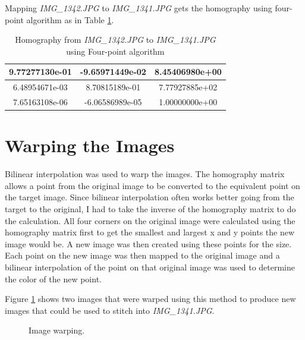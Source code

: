 \documentclass[paper=a4, fontsize=11pt]{scrartcl}
\begin{document}
Mapping \emph{IMG\_1342.JPG} to \emph{IMG\_1341.JPG} gets the homography using four-point algorithm as in Table \ref{tb:homograph:four_point}.
\begin{table}
\caption{Homography from \emph{IMG\_1342.JPG} to \emph{IMG\_1341.JPG} using Four-point algorithm}
\label{tb:homograph:four_point}
\begin{center}
\begin{tabular}{|c|c|c|}
	\hline
	9.77277130e-01 & -9.65971449e-02 &  8.45406980e+00\\
	\hline
	6.48954671e-03 &  8.70815189e-01 &  7.77927885e+02\\
	\hline
	7.65163108e-06 & -6.06586989e-05 &  1.00000000e+00\\
	\hline
\end{tabular}
\end{center}
\end{table}

\section{Warping the Images}
Bilinear interpolation was used to warp the images.  
The homography matrix allows a point from the original image to be converted to the equivalent point on the target image.  
Since bilinear interpolation often works better going from the target to the original, I had to take the inverse of the homography matrix to do the calculation.  
All four corners on the original image were calculated using the homography matrix first to get the smallest and largest x and y points the new image would be.  
A new image was then created using these points for the size.  
Each point on the new image was then mapped to the original image and a bilinear interpolation of the point on that original image was used to determine the color of the new point.

Figure \ref{fig:warping} shows two images that were warped using this method to produce new images that could be used to stitch into \emph{IMG\_1341.JPG}.  



\begin{figure}[h]
\centering
{} 
\caption{Image warping.}
\label{fig:warping}
\end{figure}
\end{document}
